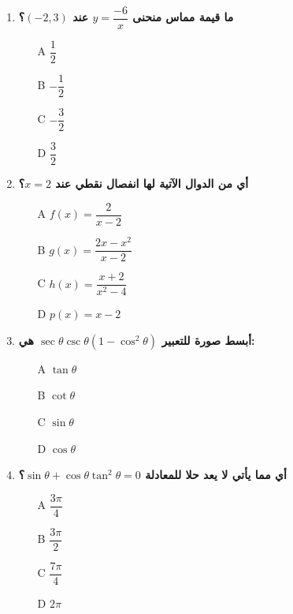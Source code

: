 \documentclass{article}
\begin{document}
\begin{enumerate}
\item \textbf{ما قيمة مماس منحنى $y = \dfrac{-6}{x}$ عند $(-2, 3)$؟}
\begin{enumerate}
    \item[A] $\dfrac{1}{2}$
    \item[B] $-\dfrac{1}{2}$
    \item[C] $-\dfrac{3}{2}$
    \item[D] $\dfrac{3}{2}$
\end{enumerate}

\item \textbf{أي من الدوال الآتية لها انفصال نقطي عند $x = 2$؟}
\begin{enumerate}
    \item[A] $f(x) = \dfrac{2}{x - 2}$
    \item[B] $g(x) = \dfrac{2x - x^2}{x - 2}$
    \item[C] $h(x) = \dfrac{x + 2}{x^2 - 4}$
    \item[D] $p(x) = x - 2$
\end{enumerate}

\item \textbf{أبسط صورة للتعبير $\sec\theta\csc\theta\left(1-\cos^2\theta\right)$ هي:}
\begin{enumerate}
    \item[A] $\tan\theta$
    \item[B] $\cot\theta$
    \item[C] $\sin\theta$
    \item[D] $\cos\theta$
\end{enumerate}

\item \textbf{أي مما يأتي لا يعد حلا للمعادلة $\sin\theta + \cos\theta\tan^2\theta = 0$؟}
\begin{enumerate}
    \item[A] $\dfrac{3\pi}{4}$
    \item[B] $\dfrac{3\pi}{2}$
    \item[C] $\dfrac{7\pi}{4}$
    \item[D] $2\pi$
\end{enumerate}


\end{enumerate}
\end{document}

